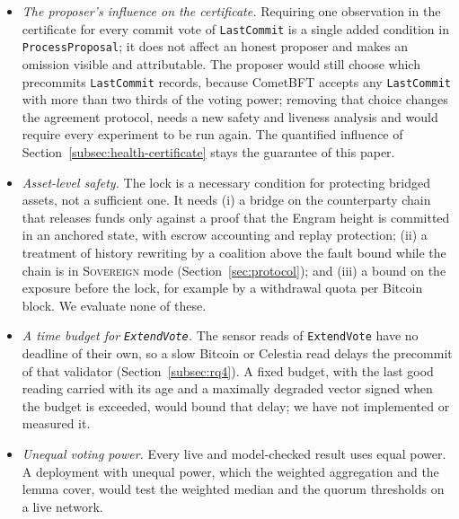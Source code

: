 \begin{itemize}
  its verification cost is unmeasured.
  \item \emph{The proposer's influence on the certificate.} Requiring one observation
  in the certificate for every commit vote of \texttt{LastCommit} is a single added
  condition in \texttt{ProcessProposal}; it does not affect an honest proposer and
  makes an omission visible and attributable. The proposer would still choose which
  precommits \texttt{LastCommit} records, because CometBFT accepts any
  \texttt{LastCommit} with more than two thirds of the voting power; removing that
  choice changes the agreement protocol, needs a new safety and liveness analysis and
  would require every experiment to be run again. The quantified influence of
  Section~\ref{subsec:health-certificate} stays the guarantee of this paper.
  \item \emph{Asset-level safety.} The lock is a necessary condition for protecting
  bridged assets, not a sufficient one. It needs (i) a bridge on the counterparty
  chain that releases funds only against a proof that the Engram height is committed
  in an anchored state, with escrow accounting and replay protection; (ii) a treatment
  of history rewriting by a coalition above the fault bound while the chain is in
  \textsc{Sovereign} mode (Section~\ref{sec:protocol}); and (iii) a bound on the
  exposure before the lock, for example by a withdrawal quota per Bitcoin block. We
  evaluate none of these.
  \item \emph{A time budget for \texttt{ExtendVote}.} The sensor reads of \texttt{ExtendVote} have no deadline of their own, so a slow Bitcoin or Celestia read delays the precommit of that validator (Section~\ref{subsec:rq4}). A fixed budget, with the last good reading carried with its age and a maximally degraded vector signed when the budget is exceeded, would bound that delay; we have not implemented or measured it.
  \item \emph{Unequal voting power.} Every live and model-checked result uses equal power. A deployment with unequal power, which the weighted aggregation and the lemma cover, would test the weighted median and the quorum thresholds on a live network.
\end{itemize}

